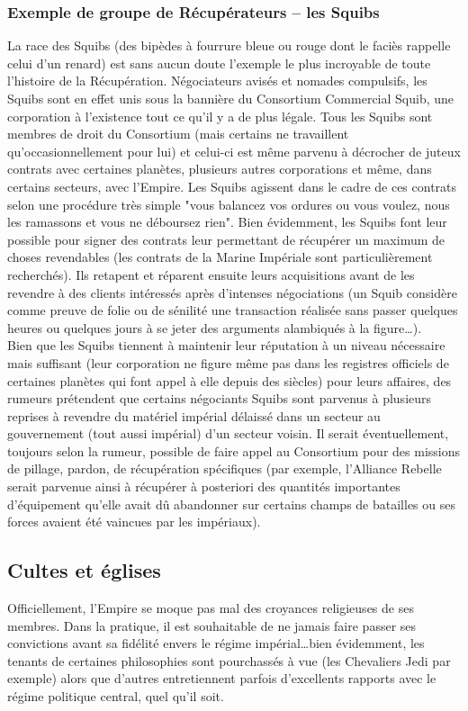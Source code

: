 \documentclass[twoside]{article}
\begin{document}
\subsubsection{Exemple de groupe de Récupérateurs – les Squibs}
La race des Squibs (des bipèdes à fourrure bleue ou rouge dont le faciès rappelle celui d'un renard) est sans aucun doute l'exemple le plus incroyable de toute l'histoire de la Récupération. Négociateurs avisés et nomades compulsifs, les Squibs sont en effet unis sous la bannière du Consortium Commercial Squib, une corporation à l'existence tout ce qu'il y a de plus légale. Tous les Squibs sont membres de droit du Consortium (mais certains ne travaillent qu'occasionnellement pour lui) et celui-ci est même parvenu à décrocher de juteux contrats avec certaines planètes, plusieurs autres corporations et même, dans certains secteurs, avec l'Empire. Les Squibs agissent dans le cadre de ces contrats selon une procédure très simple "vous balancez vos ordures ou vous voulez, nous les ramassons et vous ne déboursez rien". Bien évidemment, les Squibs font leur possible pour signer des contrats  leur permettant de récupérer un maximum de choses revendables (les contrats de la Marine Impériale sont particulièrement recherchés). Ils retapent et réparent ensuite leurs acquisitions avant de les revendre à des clients intéressés après d'intenses négociations (un Squib considère comme preuve de folie ou de sénilité une transaction réalisée sans passer quelques heures ou quelques jours à se jeter des arguments alambiqués à la figure\ldots).\\

Bien que les Squibs tiennent à maintenir leur réputation à un niveau nécessaire mais suffisant (leur corporation ne figure même pas dans les registres officiels de certaines planètes qui font appel à elle depuis des siècles) pour leurs affaires, des rumeurs prétendent que certains négociants Squibs sont parvenus à plusieurs reprises à revendre du matériel impérial délaissé dans un secteur au gouvernement (tout aussi impérial) d'un secteur voisin. Il serait éventuellement, toujours selon la rumeur, possible de faire appel au Consortium pour des missions de pillage, pardon, de récupération spécifiques (par exemple, l'Alliance Rebelle serait parvenue ainsi à récupérer à posteriori des quantités importantes d'équipement qu'elle avait dû abandonner sur certains champs de batailles ou ses forces avaient été vaincues par les impériaux).

\subsection{Cultes et églises}
Officiellement, l'Empire se moque pas mal des croyances religieuses de ses membres. Dans la pratique, il est souhaitable de ne jamais faire passer ses convictions avant sa fidélité envers le régime impérial\ldots bien évidemment, les tenants de certaines philosophies sont pourchassés à vue (les Chevaliers Jedi par exemple) alors que d'autres entretiennent parfois d'excellents rapports avec le régime politique central, quel qu'il soit.\\
\end{document}
